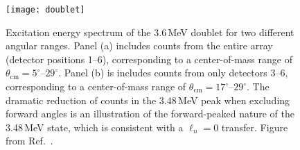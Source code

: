 \begin{figure}[t]
\centering
\texttt{[image: doublet]}%
\caption[Excitation energy spectrum of the 3.6\,MeV doublet for different angular ranges]{Excitation energy spectrum of the 3.6\,MeV doublet for two different angular ranges.  Panel (a) includes counts from the entire array (detector positions 1--6), corresponding to a center-of-mass range of $\theta_\mathrm{cm}=5^\circ$--$29^\circ$. Panel (b) is includes counts from only detectors 3--6, corresponding to a center-of-mass range of $\theta_\mathrm{cm}=17^\circ$--$29^\circ$.  The dramatic reduction of counts in the 3.48\,MeV peak when excluding forward angles is an illustration of the forward-peaked nature of the 3.48\,MeV state, which is consistent with a $\ell_n=0$ transfer.  Figure from Ref.~\cite{Wuosmaa_2011PC}.}%
\label{doublet}%
\end{figure}

%
